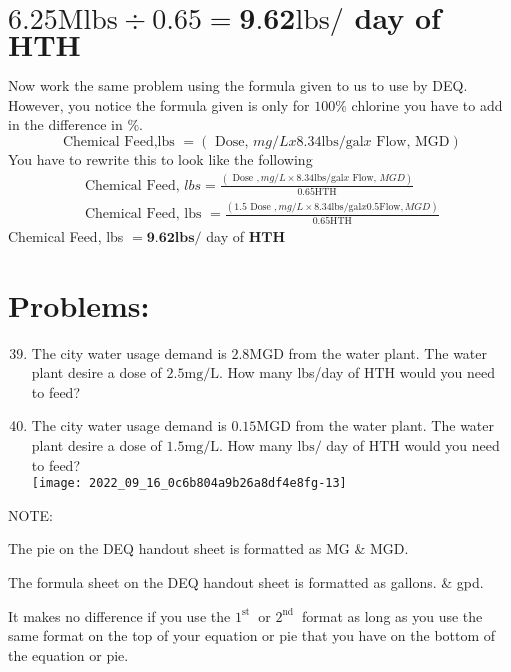 \begin{enumerate}
\section{$6.25 \mathrm{Mlbs} \div 0.65=\mathbf{9 . 6 2} \mathrm{lbs} /$ day of $\mathbf{H T H}$}
Now work the same problem using the formula given to us to use by DEQ. However, you notice the formula given is only for $100 \%$ chlorine you have to add in the difference in $\%$.
$$
\text { Chemical Feed,lbs }=(\text { Dose, } m g / L x 8.34 \mathrm{lbs} / \mathrm{gal} x \text { Flow, } \mathrm{MGD})
$$
You have to rewrite this to look like the following
$$
\begin{gathered}
\text { Chemical Feed, } l b s=\frac{(\text { Dose }, m g / L \times 8.34 \mathrm{lbs} / \mathrm{gal} x \text { Flow, } M G D)}{0.65 \mathrm{HTH}} \\
\text { Chemical Feed, lbs }=\frac{(1.5 \text { Dose }, m g / L \times 8.34 \mathrm{lbs} / \mathrm{gal} x 0.5 \mathrm{Flow}, M G D)}{0.65 \mathrm{HTH}}
\end{gathered}
$$
Chemical Feed, lbs $=\mathbf{9 . 6 2} \mathbf{l b s} /$ day of $\mathbf{H T H}$

\section{Problems:}
\begin{enumerate}
  \setcounter{enumi}{38}
  \item The city water usage demand is $2.8 \mathrm{MGD}$ from the water plant. The water plant desire a dose of $2.5 \mathrm{mg} / \mathrm{L}$. How many lbs/day of $\mathrm{HTH}$ would you need to feed?

  \item The city water usage demand is $0.15 \mathrm{MGD}$ from the water plant. The water plant desire a dose of $1.5 \mathrm{mg} / \mathrm{L}$. How many $\mathrm{lbs} /$ day of $\mathrm{HTH}$ would you need to feed?\\

\texttt{[image: 2022\_09\_16\_0c6b804a9b26a8df4e8fg-13]}

\end{enumerate}
NOTE:

The pie on the DEQ handout sheet is formatted as MG \& MGD.

The formula sheet on the DEQ handout sheet is formatted as gallons. \& gpd.

It makes no difference if you use the $1^{\text {st }}$ or $2^{\text {nd }}$ format as long as you use the same format on the top of your equation or pie that you have on the bottom of the equation or pie.


\end{enumerate}
